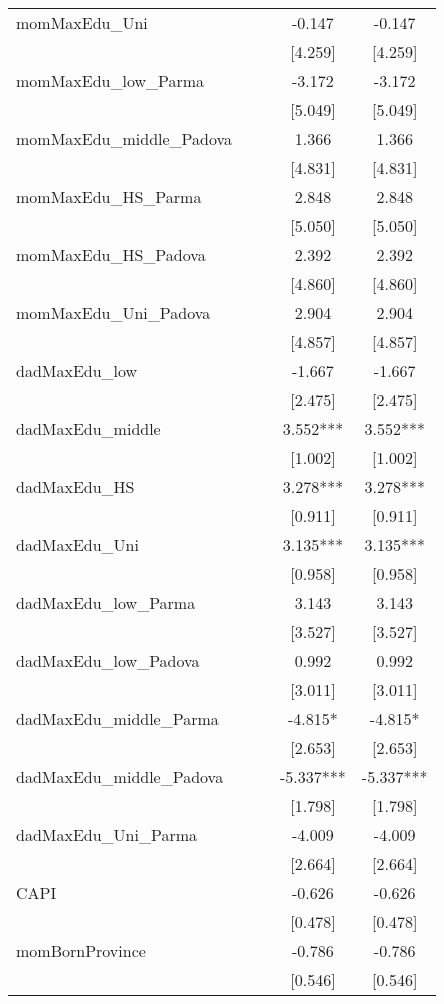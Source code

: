 \documentclass[]{article}
\begin{document}
\begin{tabular}{lcccc}
momMaxEdu\_Uni &  &  & -0.147 & -0.147 \\
 &  &  & [4.259] & [4.259] \\
momMaxEdu\_low\_Parma &  &  & -3.172 & -3.172 \\
 &  &  & [5.049] & [5.049] \\
momMaxEdu\_middle\_Padova &  &  & 1.366 & 1.366 \\
 &  &  & [4.831] & [4.831] \\
momMaxEdu\_HS\_Parma &  &  & 2.848 & 2.848 \\
 &  &  & [5.050] & [5.050] \\
momMaxEdu\_HS\_Padova &  &  & 2.392 & 2.392 \\
 &  &  & [4.860] & [4.860] \\
momMaxEdu\_Uni\_Padova &  &  & 2.904 & 2.904 \\
 &  &  & [4.857] & [4.857] \\
dadMaxEdu\_low &  &  & -1.667 & -1.667 \\
 &  &  & [2.475] & [2.475] \\
dadMaxEdu\_middle &  &  & 3.552*** & 3.552*** \\
 &  &  & [1.002] & [1.002] \\
dadMaxEdu\_HS &  &  & 3.278*** & 3.278*** \\
 &  &  & [0.911] & [0.911] \\
dadMaxEdu\_Uni &  &  & 3.135*** & 3.135*** \\
 &  &  & [0.958] & [0.958] \\
dadMaxEdu\_low\_Parma &  &  & 3.143 & 3.143 \\
 &  &  & [3.527] & [3.527] \\
dadMaxEdu\_low\_Padova &  &  & 0.992 & 0.992 \\
 &  &  & [3.011] & [3.011] \\
dadMaxEdu\_middle\_Parma &  &  & -4.815* & -4.815* \\
 &  &  & [2.653] & [2.653] \\
dadMaxEdu\_middle\_Padova &  &  & -5.337*** & -5.337*** \\
 &  &  & [1.798] & [1.798] \\
dadMaxEdu\_Uni\_Parma &  &  & -4.009 & -4.009 \\
 &  &  & [2.664] & [2.664] \\
CAPI &  &  & -0.626 & -0.626 \\
 &  &  & [0.478] & [0.478] \\
momBornProvince &  &  & -0.786 & -0.786 \\
 &  &  & [0.546] & [0.546] \\

\end{tabular}
\end{document}
